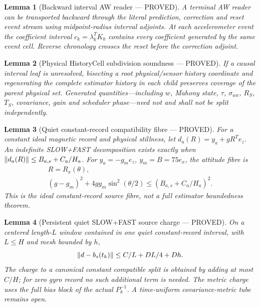 \documentclass[journal]{IEEEtran}
\newtheorem{lemma}{Lemma}\newtheorem{theorem}{Theorem}\newtheorem{proposition}{Proposition}\newtheorem{remark}{Remark}\newtheorem{corollary}{Corollary}
\begin{document}
\begin{lemma}[Backward interval AW reader --- PROVED]
A terminal AW reader can be transported backward through the literal prediction, correction and reset event stream using midpoint-radius interval adjoints.  At each accelerometer event the coefficient interval \(c_k=\lambda_k^TK_k\) contains every coefficient generated by the same event cell.  Reverse chronology crosses the reset before the correction adjoint.
\end{lemma}

\begin{lemma}[Physical HistoryCell subdivision soundness --- PROVED]
If a causal interval leaf is unresolved, bisecting a root physical/sensor history coordinate and regenerating the complete estimator history in each child preserves coverage of the parent physical set.  Generated quantities---including \(w\), Mahony state, \(\tau\), \(\sigma_{aw}\), \(R_S\), \(T_S\), covariance, gain and scheduler phase---need not and shall not be split independently.
\end{lemma}

\begin{lemma}[Quiet constant-record compatibility fibre --- PROVED]
For a constant ideal magnetic record and physical stillness, let
\(d_a(R)=y_a+gR^Te_z\). An indefinite SLOW+FAST decomposition exists exactly
when \(\left\lVert d_a(R)\right\rVert\le B_{a,s}+C_a/H_a\). For
\(y_a=-g_me_z\), \(y_m=B=75e_x\), the attitude fibre is
\[
\begin{gathered}
R=R_x(\theta),\\
(g-g_m)^2+4gg_m\sin^2(\theta/2)\le(B_{a,s}+C_a/H_a)^2.
\end{gathered}
\]
This is the ideal constant-record source fibre, not a full estimator boundedness theorem.
\end{lemma}

\begin{lemma}[Persistent quiet SLOW+FAST source charge --- PROVED]
On a centered length-\(L\) window contained in one quiet constant-record
interval, with \(L\le H\) and mesh bounded by \(h\),
\[
\left\lVert d-b_s(t_k)\right\rVert\le C/L+DL/4+Dh.
\]
The charge to a canonical constant compatible split is obtained by adding
at most \(C/H\); for zero gyro record no such additional term is needed.
The metric charge uses the full bias block of the actual \(P_k^{-1}\).
A time-uniform covariance-metric tube remains open.
\end{lemma}
\end{document}
